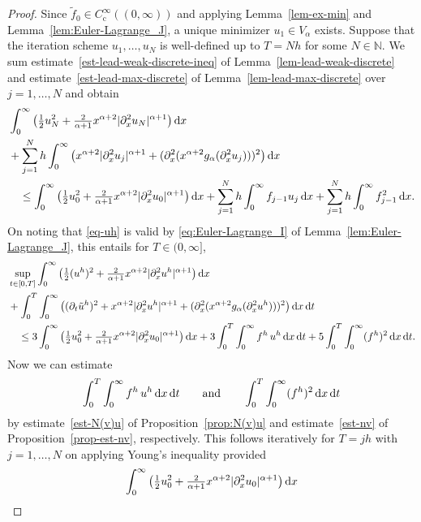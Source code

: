 \documentclass[reqno,12pt]{amsart}
\renewcommand{\d}{\ensuremath{\mathrm{d}}}
\newcommand{\N}{\ensuremath{\mathbb{N}}}
\renewcommand{\d}{\ensuremath{{\rm d}}}
\numberwithin{equation}{section}
\begin{document}
%
\begin{proof}
Since $\tilde f_0 \in C^\infty_\mathrm{c}((0,\infty))$ and applying Lemma~\ref{lem-ex-min} and Lemma~\ref{lem:Euler-Lagrange_J}, a unique minimizer $u_1 \in V_\alpha$ exists. Suppose that the iteration scheme $u_1, \ldots, u_N$ is well-defined up to $T = N h$ for some $N \in \N$. We sum estimate~\eqref{est-lead-weak-discrete-ineq} of Lemma~\ref{lem-lead-weak-discrete} and estimate~\eqref{est-lead-max-discrete} of Lemma~\ref{lem-lead-max-discrete} over $j = 1,\ldots,N$ and obtain
%
\begin{align*}
& \int_0^\infty \big(\tfrac 1 2 u_N^2 + \tfrac{2}{\alpha+1} x^{\alpha+2} |\partial_x^2 u_N|^{\alpha+1}\big) \, \d x \\
& + \sum_{j = 1}^N h \int_0^\infty \big(x^{\alpha+2} |\partial_x^2 u_j|^{\alpha+1} + (\partial_x^2 (x^{\alpha+2} g_\alpha(\partial_x^2 u_j)))^2\big) \, \d x \\
& \quad \le \int_0^\infty \big(\tfrac 1 2 u_0^2 + \tfrac{2}{\alpha+1} x^{\alpha+2} |\partial_x^2 u_0|^{\alpha+1}\big) \, \d x + \sum_{j = 1}^N h \int_0^\infty f_{j-1} u_j \, \d x + \sum_{j = 1}^N h \int_0^\infty f_{j-1}^2 \, \d x.
\end{align*}
%
On noting that \eqref{eq-uh} is valid by \eqref{eq:Euler-Lagrange_I} of Lemma~\ref{lem:Euler-Lagrange_J}, this entails for $T \in (0,\infty]$,
%
\begin{align}\nonumber
& \sup_{t \in [0,T]} \int_0^\infty \big(\tfrac 1 2 (u^h)^2 + \tfrac{2}{\alpha+1} x^{\alpha+2} |\partial_x^2 u^h|^{\alpha+1}\big) \, \d x \\
& + \int_0^T \int_0^\infty \big((\partial_t \tilde u^h)^2 + x^{\alpha+2} |\partial_x^2 u^h|^{\alpha+1} + (\partial_x^2 (x^{\alpha+2} g_\alpha(\partial_x^2 u^h)))^2\big) \, \d x \, \d t \nonumber\\
& \quad \le 3 \int_0^\infty \big(\tfrac 1 2 u_0^2 + \tfrac{2}{\alpha+1} x^{\alpha+2} |\partial_x^2 u_0|^{\alpha+1}\big) \, \d x + 3 \int_0^T \int_0^\infty f^h \, u^h \, \d x \, \d t + 5 \int_0^T \int_0^\infty (f^h)^2 \, \d x \, \d t. \label{apriori-uh}
\end{align}
%
Now we can estimate
%
\[
\int_0^T \int_0^\infty f^h \, u^h \, \d x \, \d t \qquad \text{and} \qquad \int_0^T \int_0^\infty (f^h)^2 \, \d x \, \d t
\]
%
by estimate~\eqref{est-N(v)u} of Proposition~\ref{prop:N(v)u} and estimate~\eqref{est-nv} of Proposition~\ref{prop-est-nv}, respectively. This follows iteratively for $T = j h$ with $j = 1,\ldots,N$ on applying Young's inequality provided
%
\[
\int_0^\infty \big(\tfrac 1 2 u_0^2 + \tfrac{2}{\alpha+1} x^{\alpha+2} |\partial_x^2 u_0|^{\alpha+1}\big) \, \d x
\]
\end{proof}
\end{document}
